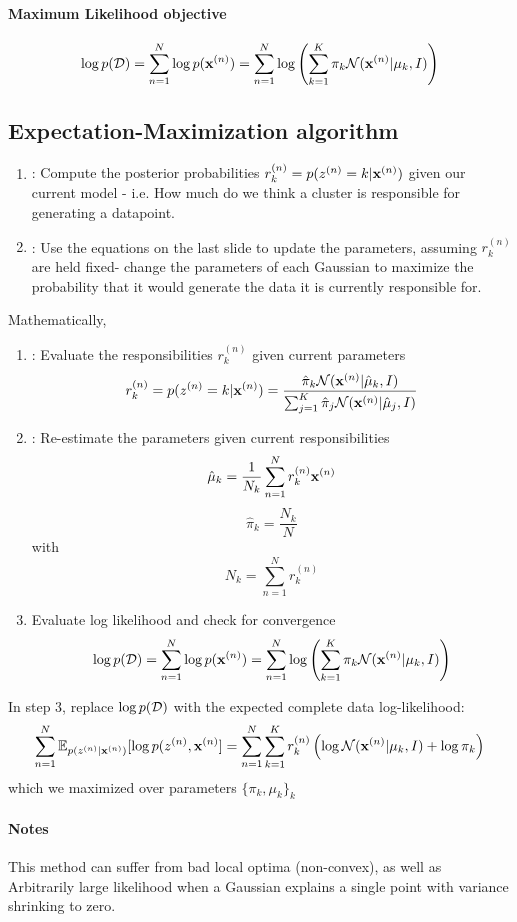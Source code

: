 \documentclass[11pt]{article}
\begin{document}
\paragraph{Maximum Likelihood objective}
$$\log p (\mathcal{D}) = \sum_{n=1}^N \log p(\textbf{x}^{(n)}) = \sum_{n=1}^N \log \left ( \sum_{k=1}^K \pi_k \mathcal{N}(\textbf{x}^{(n)}|\mu_k,I)\right )$$

\subsection{Expectation-Maximization algorithm}
\begin{enumerate}
	\item {}: Compute the posterior probabilities $r_k^{(n)} = p(z^{(n)} = k | \textbf{x}^{(n)})$ given our current model - i.e. How much do we think a cluster is responsible for generating a datapoint.
	\item {}: Use the equations on the last slide to update the parameters, assuming $r_k^{(n)}$ are held fixed- change the parameters of each Gaussian to maximize the probability that it would generate the data it is currently responsible for.
\end{enumerate}
Mathematically,
\begin{enumerate}
	\item {}: Evaluate the responsibilities $r_k^{(n)}$ given current parameters
	$$r_k^{(n)} = p(z^{(n)} = k | \textbf{x}^{(n)}) = \frac{\hat{\pi}_k\mathcal{N}(\textbf{x}^{(n)}|\hat{\mu}_k, I)}{\sum_{j=1}^K \hat{\pi}_j \mathcal{N}(\textbf{x}^{(n)}|\hat{\mu}_j, I)}$$
	\item {}: Re-estimate the parameters given current responsibilities
	$$\hat{\mu}_k = \frac{1}{N_k}\sum_{n=1}^N r_k^{(n)}\textbf{x}^{(n)}$$
	$$\hat{\pi}_k = \frac{N_k}{N}$$ with $$N_k = \sum_{n=1}^N r_k^{(n)}$$
	\item Evaluate log likelihood and check for convergence
	$$\log p (\mathcal{D}) = \sum_{n=1}^N \log p(\textbf{x}^{(n)}) = \sum_{n=1}^N \log \left ( \sum_{k=1}^K \pi_k \mathcal{N}(\textbf{x}^{(n)}|\mu_k,I)\right )$$
\end{enumerate}
In step 3, replace $\log p(\mathcal{D})$ with the expected complete data log-likelihood:
$$\sum_{n=1}^N \mathbb{E}_{p(z^{(n)}|\textbf{x}^{(n)})}[\log p(z^{(n)}, \textbf{x}^{(n)}] = \sum_{n=1}^N\sum_{k=1}^K r_k^{(n)}\left ( \log \mathcal{N}(\textbf{x}^{(n)}|\mu_k, I) + \log \pi_k \right)$$
which we maximized over parameters $\{\pi_k, \mu_k\}_k$ 

\paragraph{Notes}
This method can suffer from bad local optima (non-convex), as well as  Arbitrarily large likelihood when a Gaussian explains a single point with variance shrinking to zero.
\end{document}
